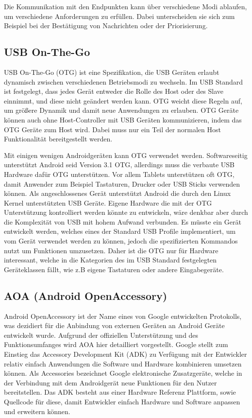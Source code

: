 \documentclass[12pt,journal,compsoc]{IEEEtran}
\begin{document}
Die Kommunikation mit den Endpunkten kann über verschiedene Modi ablaufen, um verschiedene Anforderungen zu erfüllen.
Dabei unterscheiden sie sich zum Beispiel bei der Bestätigung von Nachrichten oder der Priorisierung.  

\subsection{USB On-The-Go}
USB On-The-Go (OTG) ist eine Spezifikation, die USB Geräten erlaubt dynamisch zwischen verschiedenen Betriebsmodi zu wechseln. 
Im USB Standard ist festgelegt, dass jedes Gerät entweder die Rolle des Host oder des Slave einnimmt, und diese nicht geändert werden kann. 
OTG weicht diese Regeln auf, um größere Dynamik und damit neue Anwendungen zu erlauben.
OTG Geräte können auch ohne Host-Controller mit USB Geräten kommunizieren, indem das OTG Geräte zum Host wird.
Dabei muss nur ein Teil der normalen Host Funktionalität bereitgestellt werden.

Mit einigen wenigen Androidgeräten kann OTG verwendet werden.
Softwareseitig unterstützt Android seid Version 3.1 OTG,
allerdings muss die verbaute USB Hardware dafür OTG unterstützen.
Vor allem Tablets unterstützen oft OTG, damit Anwender zum Beispiel Tastaturen, Drucker oder USB Sticks verwenden können.
Als angeschlossenes Gerät unterstützt Android die durch den Linux Kernel unterstützten USB Geräte.
Eigene Hardware die mit der OTG Unterstützung kontrolliert werden könnte zu entwickeln, wäre denkbar aber durch die Komplexität von USB mit hohem Aufwand verbunden.
Es müsste ein Gerät entwickelt werden, welches eines der Standard USB Profile implementiert, um vom Gerät verwendet werden zu können, jedoch die spezifizierten Kommandos nutzt um Funktionen umzusetzen.
Daher ist die OTG nur für Hardware interessant, welche in die Kategorien des im USB Standard festgelegten Geräteklassen fällt, wie z.B eigene Tastaturen oder andere Eingabegeräte. 

\subsection{AOA (Android OpenAccessory)}
Android OpenAccessory ist der Name eines von Google entwickelten Protokolls, was 
dezidiert für die Anbindung von externen Geräten an Android Geräte entwickelt wurde.
Aufgrund der offiziellen Unterstützung und des Funktionsumfanges wird AOA hier detailliert vorgestellt.
Google stellt zum Einstieg das Accessory Development Kit (ADK) zu Verfügung mit der Entwickler relativ einfach Anwendungen die Software und Hardware kombinieren umsetzen können.
Als Accessories bezeichnet Google elektronische Zusatzgeräte, welche in der Verbindung mit dem Androidgerät neue Funktionen für den Nutzer bereitstellen.
Das ADK besteht aus einer Hardware Referenz Plattform, sowie Quellcode für diese, damit 
Entwickler einfach Hardware und Software anpassen und erweitern können.
\cite{developaoa}
\end{document}
